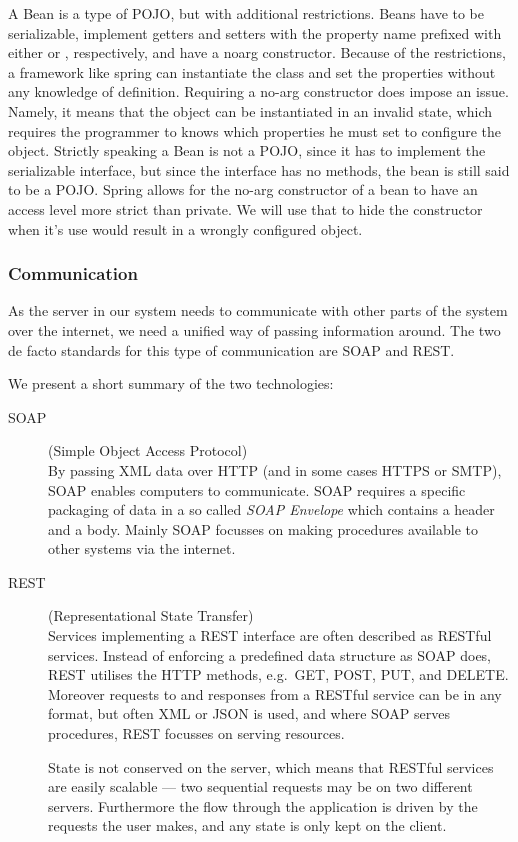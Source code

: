 A Bean is a type of \ac{POJO}, but with additional restrictions.
Beans have to be serializable, implement getters and setters with the property name prefixed with either  or , respectively, and have a noarg constructor.
Because of the restrictions, a framework like spring can instantiate the class and set the properties without any knowledge of definition.
Requiring a no-arg constructor does impose an issue.
Namely, it means that the object can be instantiated in an invalid state, which requires the programmer to knows which properties he must set to configure the object.
Strictly speaking a Bean is not a \ac{POJO}, since it has to implement the serializable interface, but since the interface has no methods, the bean is still said to be a \ac{POJO}.
Spring allows for the no-arg constructor of a bean to have an access level more strict than private.
We will use that to hide the constructor when it's use would result in a wrongly configured object.


\subsubsection{Communication}
As the server in our system needs to communicate with other parts of the system over the internet, we need a unified way of passing information around.
The two de facto standards for this type of communication are SOAP and REST.

We present a short summary of the two technologies:
\begin{description}
    \item[SOAP] (Simple Object Access Protocol)\cite{SOAP_spec}\hfill\\
        By passing XML data over HTTP (and in some cases HTTPS or SMTP), SOAP enables computers to communicate.
        SOAP requires a specific packaging of data in a so called \textit{SOAP Envelope} which contains a header and a body.
        Mainly SOAP focusses on making procedures available to other systems via the internet.
    \item[REST] (Representational State Transfer)\cite{RESTful_best_practices}\hfill\\
        Services implementing a REST interface are often described as RESTful services.
        Instead of enforcing a predefined data structure as SOAP does, REST utilises the HTTP methods, e.g.~GET, POST, PUT, and DELETE.
        Moreover requests to and responses from a RESTful service can be in any format, but often XML or JSON is used,
        and where SOAP serves procedures, REST focusses on serving resources.

        State is not conserved on the server, which means that RESTful services are easily scalable --- two sequential requests may be on two different servers.
        Furthermore the flow through the application is driven by the requests the user makes, and any state is only kept on the client.
\end{description}

